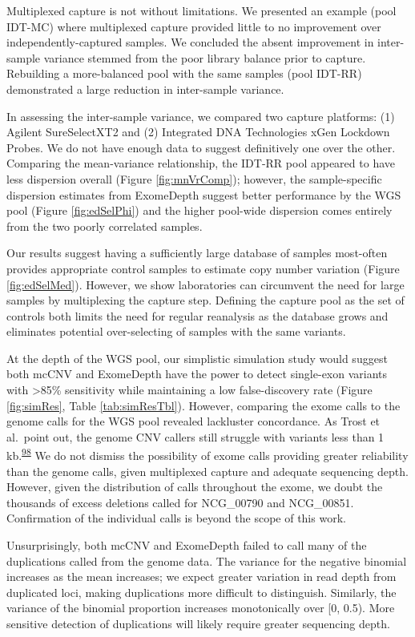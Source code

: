 \documentclass[11pt,letterpaper]{book}
\begin{document}
Multiplexed capture is not without limitations.
We presented an example (pool IDT-MC) where multiplexed capture provided little to no improvement over independently-captured samples.
We concluded the absent improvement in inter-sample variance stemmed from the poor library balance prior to capture.
Rebuilding a more-balanced pool with the same samples (pool IDT-RR) demonstrated a large reduction in inter-sample variance.

In assessing the inter-sample variance, we compared two capture platforms: (1) Agilent SureSelectXT2 and (2) Integrated DNA Technologies xGen Lockdown Probes.
We do not have enough data to suggest definitively one over the other.
Comparing the mean-variance relationship, the IDT-RR pool appeared to have less dispersion overall (Figure \ref{fig:mnVrComp}); however, the sample-specific dispersion estimates from ExomeDepth suggest better performance by the WGS pool (Figure \ref{fig:edSelPhi}) and the higher pool-wide dispersion comes entirely from the two poorly correlated samples.

Our results suggest having a sufficiently large database of samples most-often provides appropriate control samples to estimate copy number variation (Figure \ref{fig:edSelMed}).
However, we show laboratories can circumvent the need for large samples by multiplexing the capture step.
Defining the capture pool as the set of controls both limits the need for regular reanalysis as the database grows and eliminates potential over-selecting of samples with the same variants.

At the depth of the WGS pool, our simplistic simulation study would suggest both mcCNV and ExomeDepth have the power to detect single-exon variants with \textgreater85\% sensitivity while maintaining a low false-discovery rate (Figure \ref{fig:simRes}, Table \ref{tab:simResTbl}).
However, comparing the exome calls to the genome calls for the WGS pool revealed lackluster concordance.
As Trost et al.~point out, the genome CNV callers still struggle with variants less than 1 kb.\textsuperscript{\protect\hyperlink{ref-trost:2018aa}{98}}
We do not dismiss the possibility of exome calls providing greater reliability than the genome calls, given multiplexed capture and adequate sequencing depth.
However, given the distribution of calls throughout the exome, we doubt the thousands of excess deletions called for NCG\_00790 and NCG\_00851.
Confirmation of the individual calls is beyond the scope of this work.

Unsurprisingly, both mcCNV and ExomeDepth failed to call many of the duplications called from the genome data.
The variance for the negative binomial increases as the mean increases; we expect greater variation in read depth from duplicated loci, making duplications more difficult to distinguish.
Similarly, the variance of the binomial proportion increases monotonically over {[}0, 0.5).
More sensitive detection of duplications will likely require greater sequencing depth.
\end{document}
